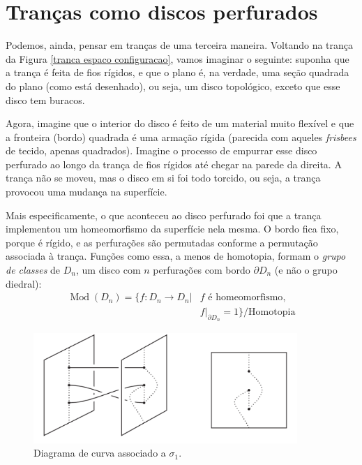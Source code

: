 \documentclass[a4paper,portuguese,11pt,twoside, leqno]{book}
\DeclareMathOperator{\Mod}{Mod}
\theoremstyle{definition}
\begin{document}
	\section{Tranças como discos perfurados}\label{secao trancas como discos perfurados}
	\hspace{12pt} Podemos, ainda, pensar em tranças de uma terceira maneira. Voltando na trança da Figura \eqref{tranca espaco configuracao}, vamos imaginar o seguinte: suponha que a trança é feita de fios rígidos, e que o plano é, na verdade, uma seção quadrada do plano (como está desenhado), ou seja, um disco topológico, exceto que esse disco tem buracos.
	\par\vspace{0.3cm} Agora, imagine que o interior do disco é feito de um material muito flexível e que a fronteira (bordo) quadrada é uma armação rígida (parecida com aqueles \textit{frisbees} de tecido, apenas quadrados). Imagine o processo de empurrar esse disco perfurado ao longo da trança de fios rígidos até chegar na parede da direita. A trança não se moveu, mas o disco em si foi todo torcido, ou seja, a trança provocou uma mudança na superfície.
	\par\vspace{0.3cm} Mais especificamente, o que aconteceu ao disco perfurado foi que a trança implementou um homeomorfismo da superfície nela mesma. O bordo fica fixo, porque é rígido, e as perfurações são permutadas conforme a permutação associada à trança. Funções como essa, a menos de homotopia, formam o \textit{grupo de classes} de $D_n$, um disco com $n$ perfurações com bordo $\partial D_n$ (e não o grupo diedral):
	\begin{align*}
	\Mod(D_n) = \{ f:D_n\to D_n|& f\text{ é homeomorfismo}, \\
	&f|_{\partial D_n} = 1 \}/\text{Homotopia}
	\end{align*}
	
	\begin{figure}[H]
		\begin{center}
			\includegraphics[width=10cm]{Images/tranca_disco_perfurado.png}
		\end{center}\caption{Diagrama de curva associado a $\sigma_1$.}
		\label{tranca disco perfurado}
	\end{figure}
	
\end{document}

